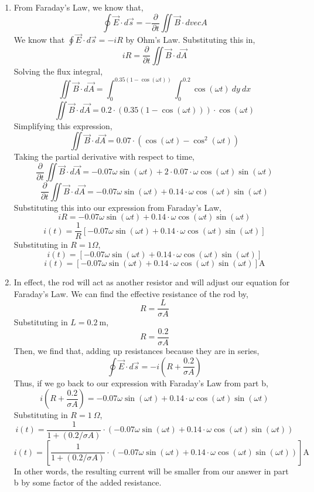 \documentclass[12pt]{article}
\begin{document}
\begin{enumerate}
\begin{enumerate}
		\item [b.]
		From Faraday's Law, we know that,
		\[\oint \vec E \cdot d\vec s = -\frac{\partial}{\partial t}\iint \vec B \cdot dvec A\]
		We know that $\oint \vec E \cdot d\vec s = -iR$ by Ohm's Law.
		Substituting this in,
		\[iR = \frac{\partial}{\partial t}\iint \vec B \cdot d\vec A\]
		Solving the flux integral,
		\[\iint \vec B \cdot d\vec A = \int_0^{0.35(1-\cos(\omega t))}\int_0^{0.2}\cos(\omega t)\: dy \: dx\]
		\[\iint \vec B \cdot d\vec A = 0.2 \cdot (0.35(1-\cos(\omega t)))\cdot \cos(\omega t)\]
		Simplifying this expression,
		\[\iint \vec B \cdot d\vec A = 0.07 \cdot(\cos(\omega t)-\cos^2(\omega t))\]
		Taking the partial derivative with respect to time,
		\[\frac{\partial}{\partial t}\iint \vec B \cdot d\vec A = -0.07\omega\sin(\omega t) + 2\cdot 0.07 \cdot \omega \cos(\omega t)\sin(\omega t)\]
		\[\frac{\partial}{\partial t}\iint \vec B \cdot d\vec A = -0.07\omega\sin(\omega t) + 0.14 \cdot \omega \cos(\omega t)\sin(\omega t)\]
		Substituting this into our expression from Faraday's Law,
		\[iR = -0.07\omega\sin(\omega t) + 0.14 \cdot \omega \cos(\omega t)\sin(\omega t)\]
		\[i(t) = \frac{1}{R}\left[-0.07\omega\sin(\omega t) + 0.14 \cdot \omega \cos(\omega t)\sin(\omega t)\right]\]
		Substituting in $R=1\Omega$,
		\[i(t) = \left[-0.07\omega\sin(\omega t) + 0.14 \cdot \omega \cos(\omega t)\sin(\omega t)\right]\]
		\[\boxed{i(t) = \left[-0.07\omega\sin(\omega t) + 0.14 \cdot \omega \cos(\omega t)\sin(\omega t)\right]\mathrm{A}}\]

		\item [c.]
		In effect, the rod will act as another resistor and will adjust our equation for Faraday's Law.
		We can find the effective resistance of the rod by,
		\[R= \frac{L}{\sigma A}\]
		Substituting in $L=0.2 \: \mathrm{m}$,
		\[R = \frac{0.2}{\sigma A}\]
		Then, we find that, adding up resistances because they are in series,
		\[\oint \vec E \cdot d\vec s = -i\left(R + \frac{0.2}{\sigma A}\right)\]
		Thus, if we go back to our expression with Faraday's Law from part b,
		\[i\left(R + \frac{0.2}{\sigma A}\right)=-0.07\omega\sin(\omega t) + 0.14 \cdot \omega \cos(\omega t)\sin(\omega t)\]
		Substituting in $R=1\:\Omega$,
		\[i(t)=\frac{1}{1+(0.2/\sigma A)}\cdot\left(-0.07\omega\sin(\omega t) + 0.14 \cdot \omega \cos(\omega t)\sin(\omega t)\right)\]
		\[\boxed{i(t)=\left[\frac{1}{1+(0.2/\sigma A)}\cdot\left(-0.07\omega\sin(\omega t) + 0.14 \cdot \omega \cos(\omega t)\sin(\omega t)\right)\right] \mathrm{A}}\]
		In other words, the resulting current will be smaller from our answer in part b by some factor of the added resistance.
	\end{enumerate}



	
	
	
\end{enumerate}

		
\end{document}
